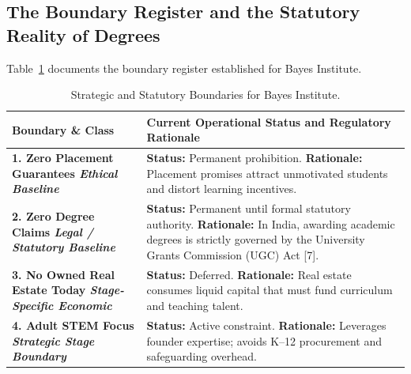\subsection{The Boundary Register and the Statutory Reality of Degrees}

Table~\ref{tab:bayes-boundaries} documents the boundary register established for Bayes Institute.

\begin{table}[htbp]
\centering
\begin{tcolorbox}[
  enhanced,
  colback=white,
  colframe=BayesBorder!80!white,
  boxrule=0.4pt,
  arc=2pt,
  left=3pt,right=3pt,top=3pt,bottom=3pt,
  before skip=3pt,after skip=4pt
]
\scriptsize
\setlength{\tabcolsep}{3pt}
\renewcommand{\arraystretch}{1.18}
\begin{tabularx}{\linewidth}{@{} >{\bfseries\color{BayesInk}}p{2.3cm} >{\color{BayesInk}}X @{}}
\toprule
\textbf{Boundary \& Class} & \textbf{Current Operational Status and Regulatory Rationale} \\
\midrule
1. Zero Placement Guarantees\newline
\textit{Ethical Baseline} & 
\textbf{Status:} Permanent prohibition.\newline
\textbf{Rationale:} Placement promises attract unmotivated students and distort learning incentives. \\
\midrule
2. Zero Degree Claims\newline
\textit{Legal / Statutory Baseline} & 
\textbf{Status:} Permanent until formal statutory authority.\newline
\textbf{Rationale:} In India, awarding academic degrees is strictly governed by the University Grants Commission (UGC) Act [7]. \\
\midrule
3. No Owned Real Estate Today\newline
\textit{Stage-Specific Economic} & 
\textbf{Status:} Deferred.\newline
\textbf{Rationale:} Real estate consumes liquid capital that must fund curriculum and teaching talent. \\
\midrule
4. Adult STEM Focus\newline
\textit{Strategic Stage Boundary} & 
\textbf{Status:} Active constraint.\newline
\textbf{Rationale:} Leverages founder expertise; avoids K--12 procurement and safeguarding overhead. \\
\bottomrule
\end{tabularx}
\end{tcolorbox}
\caption{Strategic and Statutory Boundaries for Bayes Institute.}
\label{tab:bayes-boundaries}
\end{table}

